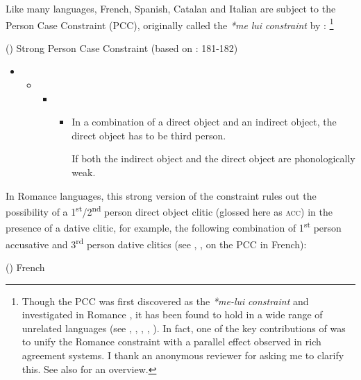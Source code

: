 \documentclass[output=paper,modfonts,nonflat]{langsci/langscibook}
\begin{document}
Like many languages, French, Spanish, Catalan and Italian are subject to the Person Case Constraint (PCC), originally called the \textit{*me} \textit{lui} \textit{constraint} by \citet{Perlmutter1971}: \footnote{Though the PCC was first discovered as the \textit{*me-lui} \textit{constraint} and investigated in Romance \citep{Perlmutter1971}, it has been found to hold in a wide range of unrelated languages (see \citealt{Bonet1991}, \citealt{Albizu1997}, \citealt{Rezac2008}, \citealt{Haspelmath2004}, \citealt{AdgerHarbour2007}). In fact, one of the key contributions of \citet{Bonet1991} was to unify the Romance constraint with a parallel effect observed in rich agreement systems. I thank an anonymous reviewer for asking me to clarify this. See also \citet{Bonet2007} for an overview.} 

()  Strong Person Case Constraint (based on \citealt{Bonet1991}: 181-182)

\begin{itemize}
\item \begin{itemize}
\item \begin{itemize}
\item \begin{itemize}
\item \begin{styleListParagraph}
In a combination of a direct object and an indirect object, the direct object has to be third person.
\end{styleListParagraph}
\begin{styleListParagraph}
If both the indirect object and the direct object are phonologically weak. 
\end{styleListParagraph}
\end{itemize}
\end{itemize}
\end{itemize}
\end{itemize}

In Romance languages, this strong version of the constraint rules out the possibility of a 1\textsuperscript{st}/2\textsuperscript{nd} person direct object clitic (glossed here as \textsc{acc}) in the presence of a dative clitic, for example, the following combination of 1\textsuperscript{st} person accusative and 3\textsuperscript{rd} person dative clitics (see \citealt{Perlmutter1971}, \citealt{Kayne1975}, \citealt{Postal1981} on the PCC in French):

()  French \citep[173]{Kayne1975}
\end{document}

